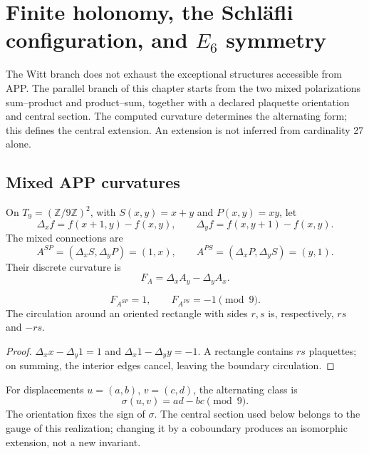 \section{Finite holonomy, the Schläfli configuration, and \texorpdfstring{\(E_6\)}{E6} symmetry}
\label{p12-83-c20-s6:chap:holonomia-schlafli-e6-nuevo}

The Witt branch does not exhaust the exceptional structures accessible from
APP. The parallel branch of this chapter starts from the two mixed
polarizations sum--product and product--sum, together with a declared
plaquette orientation and central section. The computed curvature determines
the alternating form; this defines the central extension. An extension
is not inferred from cardinality 27 alone.

\subsection{Mixed APP curvatures}

On \(T_9=(\mathbb Z/9\mathbb Z)^2\), with
\(S(x,y)=x+y\) and \(P(x,y)=xy\), let
\[
 \Delta_xf=f(x+1,y)-f(x,y),\qquad
 \Delta_yf=f(x,y+1)-f(x,y).
\]
The mixed connections are
\[
 A^{SP}=(\Delta_xS,\Delta_yP)=(1,x),\qquad
 A^{PS}=(\Delta_xP,\Delta_yS)=(y,1).
\]
Their discrete curvature is
\[
 F_A=\Delta_xA_y-\Delta_yA_x.
\]

\begin{proposition}
\label{p12-83-c20-s6:prop:curvaturas-app-e6-nuevo}
\[
 F_{A^{SP}}=1,\qquad F_{A^{PS}}=-1\pmod9.
\]
The circulation around an oriented rectangle with sides \(r,s\) is,
respectively, \(rs\) and \(-rs\).
\end{proposition}

\begin{proof}
\(\Delta_xx-\Delta_y1=1\) and
\(\Delta_x1-\Delta_yy=-1\). A rectangle contains \(rs\) plaquettes; on
summing, the interior edges cancel, leaving the boundary circulation.
\end{proof}

For displacements \(u=(a,b)\), \(v=(c,d)\), the alternating class is
\begin{equation}
 \sigma(u,v)=ad-bc\pmod9.
 \label{p12-83-c20-s6:eq:forma-alternante-e6-nueva}
\end{equation}
The orientation fixes the sign of \(\sigma\). The central section used
below belongs to the gauge of this realization; changing it by a coboundary
produces an isomorphic extension, not a new invariant.

